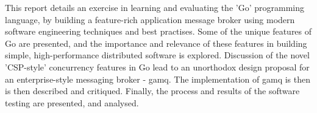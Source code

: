 This report details an exercise in learning and evaluating the 'Go' programming
language, by building a feature-rich application message broker using modern
software engineering techniques and best practises. Some of the unique features
of Go are presented, and the importance and relevance of these features in
building simple, high-performance distributed software is explored. Discussion
of the novel 'CSP-style' concurrency features in Go lead to an unorthodox design
proposal for an enterprise-style messaging broker - \gls{gamq}. The
implementation of \gls{gamq} is then  is then described and critiqued. Finally,
the process and results of the software testing are presented, and analysed.
